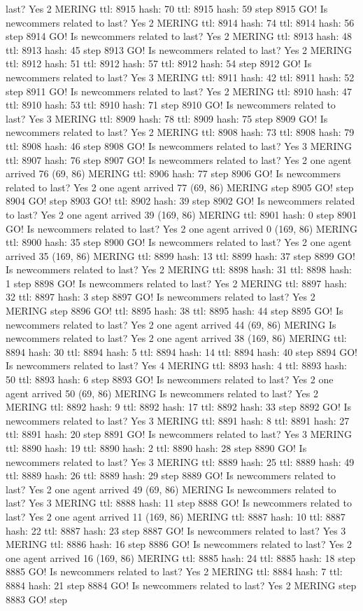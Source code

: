 last? Yes 2 MERING ttl: 8915 hash: 70 ttl: 8915 hash: 59 step 8915 GO! Is newcommers related to last? Yes 2 MERING ttl: 8914 hash: 74 ttl: 8914 hash: 56 step 8914 GO! Is newcommers related to last? Yes 2 MERING ttl: 8913 hash: 48 ttl: 8913 hash: 45 step 8913 GO! Is newcommers related to last? Yes 2 MERING ttl: 8912 hash: 51 ttl: 8912 hash: 57 ttl: 8912 hash: 54 step 8912 GO! Is newcommers related to last? Yes 3 MERING ttl: 8911 hash: 42 ttl: 8911 hash: 52 step 8911 GO! Is newcommers related to last? Yes 2 MERING ttl: 8910 hash: 47 ttl: 8910 hash: 53 ttl: 8910 hash: 71 step 8910 GO! Is newcommers related to last? Yes 3 MERING ttl: 8909 hash: 78 ttl: 8909 hash: 75 step 8909 GO! Is newcommers related to last? Yes 2 MERING ttl: 8908 hash: 73 ttl: 8908 hash: 79 ttl: 8908 hash: 46 step 8908 GO! Is newcommers related to last? Yes 3 MERING ttl: 8907 hash: 76 step 8907 GO! Is newcommers related to last? Yes 2 one agent arrived 76 (69, 86) MERING ttl: 8906 hash: 77 step 8906 GO! Is newcommers related to last? Yes 2 one agent arrived 77 (69, 86) MERING step 8905 GO! step 8904 GO! step 8903 GO! ttl: 8902 hash: 39 step 8902 GO! Is newcommers related to last? Yes 2 one agent arrived 39 (169, 86) MERING ttl: 8901 hash: 0 step 8901 GO! Is newcommers related to last? Yes 2 one agent arrived 0 (169, 86) MERING ttl: 8900 hash: 35 step 8900 GO! Is newcommers related to last? Yes 2 one agent arrived 35 (169, 86) MERING ttl: 8899 hash: 13 ttl: 8899 hash: 37 step 8899 GO! Is newcommers related to last? Yes 2 MERING ttl: 8898 hash: 31 ttl: 8898 hash: 1 step 8898 GO! Is newcommers related to last? Yes 2 MERING ttl: 8897 hash: 32 ttl: 8897 hash: 3 step 8897 GO! Is newcommers related to last? Yes 2 MERING step 8896 GO! ttl: 8895 hash: 38 ttl: 8895 hash: 44 step 8895 GO! Is newcommers related to last? Yes 2 one agent arrived 44 (69, 86) MERING Is newcommers related to last? Yes 2 one agent arrived 38 (169, 86) MERING ttl: 8894 hash: 30 ttl: 8894 hash: 5 ttl: 8894 hash: 14 ttl: 8894 hash: 40 step 8894 GO! Is newcommers related to last? Yes 4 MERING ttl: 8893 hash: 4 ttl: 8893 hash: 50 ttl: 8893 hash: 6 step 8893 GO! Is newcommers related to last? Yes 2 one agent arrived 50 (69, 86) MERING Is newcommers related to last? Yes 2 MERING ttl: 8892 hash: 9 ttl: 8892 hash: 17 ttl: 8892 hash: 33 step 8892 GO! Is newcommers related to last? Yes 3 MERING ttl: 8891 hash: 8 ttl: 8891 hash: 27 ttl: 8891 hash: 20 step 8891 GO! Is newcommers related to last? Yes 3 MERING ttl: 8890 hash: 19 ttl: 8890 hash: 2 ttl: 8890 hash: 28 step 8890 GO! Is newcommers related to last? Yes 3 MERING ttl: 8889 hash: 25 ttl: 8889 hash: 49 ttl: 8889 hash: 26 ttl: 8889 hash: 29 step 8889 GO! Is newcommers related to last? Yes 2 one agent arrived 49 (69, 86) MERING Is newcommers related to last? Yes 3 MERING ttl: 8888 hash: 11 step 8888 GO! Is newcommers related to last? Yes 2 one agent arrived 11 (169, 86) MERING ttl: 8887 hash: 10 ttl: 8887 hash: 22 ttl: 8887 hash: 23 step 8887 GO! Is newcommers related to last? Yes 3 MERING ttl: 8886 hash: 16 step 8886 GO! Is newcommers related to last? Yes 2 one agent arrived 16 (169, 86) MERING ttl: 8885 hash: 24 ttl: 8885 hash: 18 step 8885 GO! Is newcommers related to last? Yes 2 MERING ttl: 8884 hash: 7 ttl: 8884 hash: 21 step 8884 GO! Is newcommers related to last? Yes 2 MERING step 8883 GO! step 